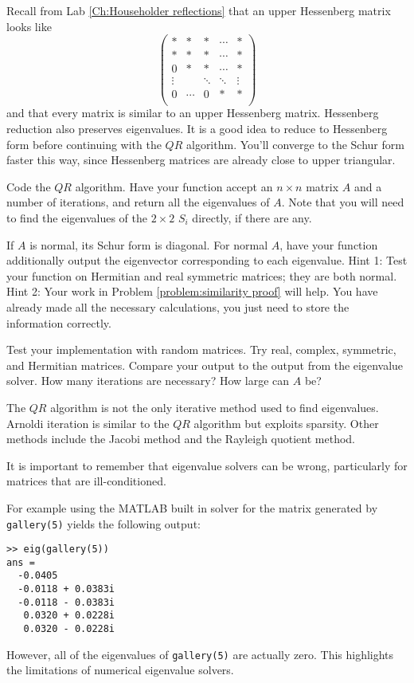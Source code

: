 Recall from Lab \ref{Ch:Householder reflections} that an upper Hessenberg matrix looks like
\[
\begin{pmatrix}
*           & * & \ast & \cdots   & *\\
*           & * & * & \cdots   & * \\
0          & * & * &  \cdots&* \\
\vdots &  & \ddots    & \ddots & \vdots \\
0 & \cdots & 0 & * & *\\
\end{pmatrix} 
\]
and that every matrix is similar to an upper Hessenberg matrix. Hessenberg reduction also preserves eigenvalues. It is a good idea to reduce to Hessenberg form before continuing with the $QR$ algorithm. You'll converge to the Schur form faster this way, since Hessenberg matrices are already close to upper triangular.

\begin{problem}
Code the $QR$ algorithm. Have your function accept an $n \times n$ matrix $A$ and a number of iterations, and return all the eigenvalues of $A$. Note that you will need to find the eigenvalues of the $2 \times 2$ $S_i$ directly, if there are any.
\end{problem}

\begin{problem}
If $A$ is normal, its Schur form is diagonal. For normal $A$, have your function additionally output the eigenvector corresponding to each eigenvalue. Hint 1: Test your function on Hermitian and real symmetric matrices; they are both normal. Hint 2: Your work in Problem \ref{problem:similarity proof} will help. You have already made all the necessary calculations, you just need to store the information correctly.
\end{problem}

\begin{problem}
Test your implementation with random matrices. Try real, complex, symmetric, and Hermitian matrices. Compare your output to the output from the eigenvalue solver. How many iterations are necessary? How large can $A$ be?
\end{problem}

The $QR$ algorithm is not the only iterative method used to find eigenvalues. Arnoldi iteration is similar to the $QR$ algorithm but exploits sparsity. Other methods include the Jacobi method and the Rayleigh quotient method.

It is important to remember that eigenvalue solvers can be wrong, particularly for matrices that are ill-conditioned. 
\begin{matlab}
For example using the MATLAB built in solver for the matrix generated by {\tt gallery(5)} yields the following output:
\begin{lstlisting}[style=matlab]
>> eig(gallery(5))
ans =
  -0.0405          
  -0.0118 + 0.0383i
  -0.0118 - 0.0383i
   0.0320 + 0.0228i
   0.0320 - 0.0228i
\end{lstlisting}

However, all of the eigenvalues of {\tt gallery(5)} are actually zero. This highlights the limitations of numerical eigenvalue solvers.
\end{matlab}
